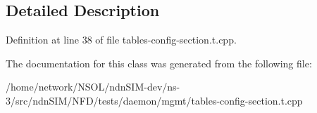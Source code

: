 \subsection{Detailed Description}


Definition at line 38 of file tables-\/config-\/section.\+t.\+cpp.



The documentation for this class was generated from the following file\+:\begin{DoxyCompactItemize}
\item 
/home/network/\+N\+S\+O\+L/ndn\+S\+I\+M-\/dev/ns-\/3/src/ndn\+S\+I\+M/\+N\+F\+D/tests/daemon/mgmt/tables-\/config-\/section.\+t.\+cpp\end{DoxyCompactItemize}
